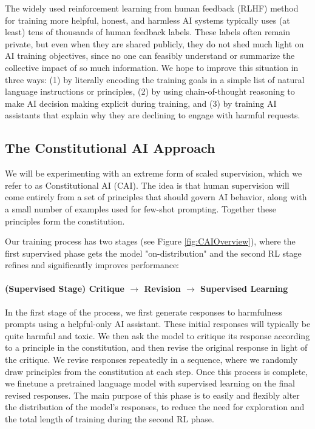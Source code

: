 \documentclass[english]{article}
\renewcommand\>{\rangle}
\begin{document}
The  widely used reinforcement learning from human feedback (RLHF) method \cite{christiano2017deep, stiennon2020learning} for training more helpful, honest, and harmless AI systems \cite{bai2022training, LaMDA, InstructGPT, SparrowDM} typically uses (at least) tens of thousands of human feedback labels.  These labels often remain  private, but even when they are shared publicly, they do not shed much light on AI training objectives, since no one can feasibly understand or summarize the collective impact of so much information.
We hope to improve this situation in three ways: (1) by literally encoding the training goals in a simple list of natural language instructions or principles, (2) by using chain-of-thought reasoning \cite{ScratchPad, ChainOfThought} to make AI decision making explicit during training, and (3) by training AI assistants that explain why they are declining to engage with harmful requests.


\subsection{The Constitutional AI Approach}

We will be experimenting with an extreme form of scaled supervision, which we refer to as Constitutional AI (CAI).  The idea is that human supervision will come entirely from a set of principles that should govern AI behavior, along with a small number of examples used for few-shot prompting.  Together these principles form the constitution.

Our training process has two stages (see Figure \ref{fig:CAIOverview}), where the first supervised phase gets the model "on-distribution" and the second RL stage refines and significantly improves performance:

\paragraph{(Supervised Stage) Critique $\to$ Revision $\to$ Supervised Learning} 
In the first stage of the process, we first generate responses to harmfulness prompts using a helpful-only AI assistant.  These initial responses will typically be quite harmful and toxic.  We then ask the model to critique its response according to a principle in the constitution, and then revise the original response in light of the critique.  We revise responses repeatedly in a sequence, where we randomly draw principles from the constitution at each step.  Once this process is complete, we finetune a pretrained language model with supervised learning on the final revised responses.  The main purpose of this phase is to easily and flexibly alter the distribution of the model's responses, to reduce the need for exploration and the total length of training  during the second RL phase.
\end{document}
